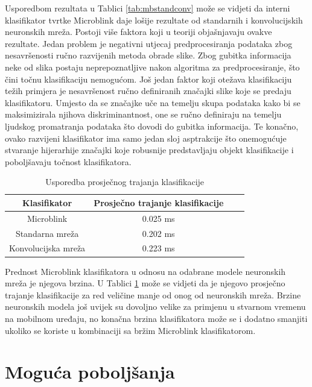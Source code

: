 \documentclass[lmodern, utf8, diplomski, numeric]{fer}
\begin{document}
Usporedbom rezultata u Tablici \ref{tab:mbstandconv} može se vidjeti da interni klasifikator tvrtke Microblink daje lošije rezultate od standarnih i konvolucijskih neuronskih mreža.
Postoji više faktora koji u teoriji objašnjavaju ovakve rezultate. Jedan problem je negativni utjecaj predprocesiranja podataka zbog nesavršenosti ručno razvijenih metoda obrade slike. Zbog gubitka informacija neke od slika postaju neprepoznatljive nakon algoritma za predprocesiranje, što čini točnu klasifikaciju nemogućom. Još jedan faktor koji otežava klasifikaciju težih primjera je nesavršenost ručno definiranih značajki slike koje se predaju klasifikatoru. Umjesto da se značajke uče na temelju skupa podataka kako bi se maksimizirala njihova diskriminantnost, one se ručno definiraju na temelju ljudskog promatranja podataka što dovodi do gubitka informacija. Te konačno, ovako razvijeni klasifikator ima samo jedan sloj asptrakcije što onemogućuje stvaranje hijerarhije značajki koje robusnije predstavljaju objekt klasifikacije i poboljšavaju točnost klasifikatora.

\hspace{2em}
\begin{table}[ht!]
\begin{center}
\centering
    \begin{tabular}{ | c| c| c|c |}
    \hline    		
    Klasifikator & Prosječno trajanje klasifikacije \\ \hline
    Microblink & 0.025 ms \\ \hline
    Standarna mreža & 0.202 ms  \\ \hline
    Konvolucijska mreža &  0.223 ms \\
    \hline
    \end{tabular} 
\end{center}
\caption{Usporedba prosječnog trajanja klasifikacije}
\label{tab:avgduration}
\end{table}

Prednost Microblink klasifikatora u odnosu na odabrane modele neuronskih mreža je njegova brzina. U Tablici \ref{tab:avgduration} može se vidjeti da je njegovo prosječno trajanje klasifikacije za red veličine manje od onog od neuronskih mreža. Brzine neuronskih modela još uvijek su dovoljno velike za primjenu u stvarnom vremenu na mobilnom uređaju, no konačna brzina klasifikatora može se i dodatno smanjiti ukoliko se koriste u kombinaciji sa bržim Microblink klasifikatorom. 

\section{Moguća poboljšanja}
 
\end{document}
